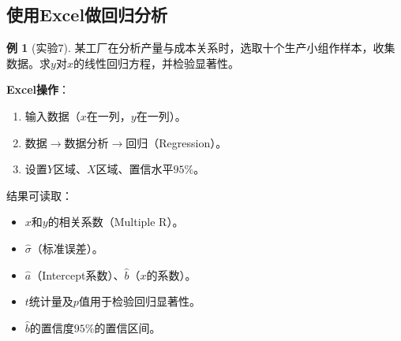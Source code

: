 \documentclass[11pt,a4paper]{report}
\theoremstyle{definition}
\newtheorem{example}{例}[chapter]
\theoremstyle{plain}
\begin{document}
\subsection{使用Excel做回归分析}

\begin{example}[实验7]
某工厂在分析产量与成本关系时，选取十个生产小组作样本，收集数据。求$y$对$x$的线性回归方程，并检验显著性。

\textbf{Excel操作}：
\begin{enumerate}[label=\arabic*.,leftmargin=2em]
    \item 输入数据（$x$在一列，$y$在一列）。
    \item 数据$\to$数据分析$\to$回归（Regression）。
    \item 设置$Y$区域、$X$区域、置信水平$95\%$。
\end{enumerate}

结果可读取：
\begin{itemize}[leftmargin=2em]
    \item $x$和$y$的相关系数（Multiple R）。
    \item $\hat{\sigma}$（标准误差）。
    \item $\hat{a}$（Intercept系数）、$\hat{b}$（$x$的系数）。
    \item $t$统计量及$p$值用于检验回归显著性。
    \item $\hat{b}$的置信度$95\%$的置信区间。
\end{itemize}
\end{example}
\end{document}
